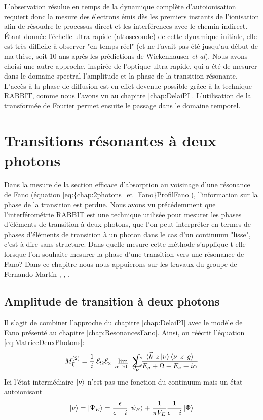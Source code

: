 L'observation résulue en temps de la dynamique complète d'autoionisation requiert donc la mesure des électrons émis dès les premiers instants de l'ionisation afin de résoudre le processus direct et les interférences avec le chemin indirect. \'{E}tant donnée l'échelle ultra-rapide (attoseconde) de cette dynamique initiale, elle est très difficile à observer "en temps réel" (et ne l'avait pas été jusqu'au début de ma thèse, soit 10 ans après les prédictions de Wickenhauser \textit{et al}). Nous avons choisi une autre approche, inspirée de l'optique ultra-rapide, qui a été de mesurer dans le domaine spectral l'amplitude et la phase de la transition résonante. L'accès à la phase de diffusion est en effet devenue possible grâce à la technique RABBIT, comme nous l'avons vu au chapitre \ref{chap:DelaiPI}. L'utilisation de la transformée de Fourier permet ensuite le passage dans le domaine temporel.

\chapter{Transitions résonantes à deux photons}
\label{chap:2photons_et_Fano}
Dans la mesure de la section efficace d'absorption au voisinage d'une résonance de Fano (équation \ref{eq:{chap:2photons_et_Fano}ProfilFano}), l'information sur la phase de la transition est perdue. Nous avons vu précédemment que l'interférométrie RABBIT est une technique utilisée pour mesurer les phases d'éléments de transition à deux photons, que l'on peut interpréter en termes de phases d'éléments de transition à un photon dans le cas d'un continuum "lisse", c'est-à-dire sans structure. Dans quelle mesure cette méthode s'applique-t-elle lorsque l'on souhaite mesurer la phase d'une transition vers une résonance de Fano? Dans ce chapitre nous nous appuierons sur les travaux du groupe de Fernando Mart\'{i}n , , .

\section{Amplitude de transition à deux photons}
Il s'agit de combiner l'approche du chapitre \ref{chap:DelaiPI} avec le modèle de Fano présenté au chapitre \ref{chap:ResonancesFano}. Ainsi, on réécrit l'équation \ref{eq:MatriceDeuxPhotons}:
\begin{equation}
M_{\vec{k}}^{(2)} = \frac{1}{i} \: \mathcal{E}_\Omega \mathcal{E}_\omega \: \lim \limits_{\alpha \rightarrow 0^+} \sum_{\nu} \! \! \! \! \! \! \! \! \! \int \frac{\bra{\vec{k}} z\ket{\nu} \bra{\nu} z \ket{g}} {E_g + \Omega - E_{\nu} + i \alpha}
\end{equation}
Ici l'état intermédiaire $\ket{\nu}$ n'est pas une fonction du continuum mais un état autoionisant
\begin{equation}
\ket{\nu} = \ket{\Psi_E} = \frac{\epsilon}{\epsilon - i} \ket{\psi_E} + \frac{1}{\pi V_E} \frac{1}{\epsilon - i} \ket{\Phi}
\end{equation}

